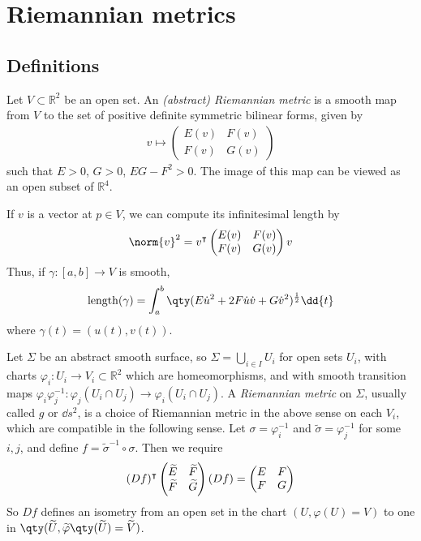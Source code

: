 \section{Riemannian metrics}

\subsection{Definitions}
\begin{definition}
	Let $V \subset \mathbb R^2$ be an open set.
	An \textit{(abstract) Riemannian metric} is a smooth map from $V$ to the set of positive definite symmetric bilinear forms, given by
	\begin{align*}
		v \mapsto \begin{pmatrix}
			E(v) & F(v) \\
			F(v) & G(v)
		\end{pmatrix}
	\end{align*}
	such that $E > 0$, $G > 0$, $EG - F^2 > 0$.
	The image of this map can be viewed as an open subset of $\mathbb R^4$.
\end{definition}
If $v$ is a vector at $p \in V$, we can compute its infinitesimal length by
\begin{align*}
	\norm{v}^2 = v^\tran \begin{pmatrix}
		E(v) & F(v) \\
		F(v) & G(v)
	\end{pmatrix} v
\end{align*}
Thus, if $\gamma \colon [a,b] \to V$ is smooth,
\begin{align*}
	\mathrm{length}(\gamma) = \int_a^b \qty( E \dot u^2 + 2F \dot u \dot v + G \dot v^2 )^{\frac{1}{2}} \dd{t}
\end{align*}
where $\gamma(t) = (u(t),v(t))$.
\begin{definition}
	Let $\Sigma$ be an abstract smooth surface, so $\Sigma = \bigcup_{i \in I} U_i$ for open sets $U_i$, with charts $\varphi_i \colon U_i \to V_i \subset \mathbb R^2$ which are homeomorphisms, and with smooth transition maps $\varphi_i \varphi_j^{-1} \colon \varphi_j(U_i \cap U_j) \to \varphi_i(U_i \cap U_j)$.
	A \textit{Riemannian metric} on $\Sigma$, usually called $g$ or $\dd{s}^2$, is a choice of Riemannian metric in the above sense on each $V_i$, which are compatible in the following sense.
	Let $\sigma = \varphi_i^{-1}$ and $\widetilde \sigma = \varphi_j^{-1}$ for some $i,j$, and define $f = \widetilde \sigma^{-1} \circ \sigma$.
	Then we require
	\begin{align*}
		(Df)^\intercal \begin{pmatrix}
			\widetilde E & \widetilde F \\
			\widetilde F & \widetilde G
		\end{pmatrix} (Df) = \begin{pmatrix}
			E & F \\
			F & G
		\end{pmatrix}
	\end{align*}
	So $Df$ defines an isometry from an open set in the chart $(U, \varphi(U) = V)$ to one in $\qty(\widetilde U, \widetilde \varphi\qty(\widetilde U) = \widetilde V)$.
\end{definition}
